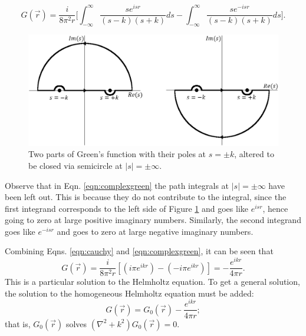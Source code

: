 %
\begin{equation}
\label{eqn:complexgreen}
G(\vec{r})=\frac{i}{8\pi^2r}\Big[ \int_{-\infty}^\infty \frac{se^{isr}}{(s-k)(s+k)}ds-\int_{-\infty}^\infty \frac{se^{-isr}}{(s-k)(s+k)}ds \Big].
\end{equation}
%
\begin{figure}
  \centering
    \includegraphics[width=\textwidth]{Figures/complexgreen} 
  \caption{Two parts of Green's function with their poles at $s=\pm k$, altered to be closed via semicircle at $|s|=\pm\infty$.}
  \label{fig:complexgreen}
\end{figure}

Observe that in Eqn. \ref{eqn:complexgreen} the path integrals at $|s|=\pm\infty$ have been left out. This is because they do not contribute to the integral, since the first integrand corresponds to the left side of Figure \ref{fig:complexgreen} and goes like $e^{isr}$, hence going to zero at large positive imaginary numbers. Similarly, the second integrand goes like $e^{-isr}$ and goes to zero at large negative imaginary numbers.

Combining Eqns. \ref{eqn:cauchy} and \ref{eqn:complexgreen}, it can be seen that
%
\begin{equation}
\nonumber
G(\vec{r})=\frac{i}{8\pi^2r}[(i\pi e^{ikr})-(-i\pi e^{ikr})]=-\frac{e^{ikr}}{4\pi r}.
\end{equation}
This is a particular solution to the Helmholtz equation. To get a general solution, the solution to the homogeneous Helmholtz equation must be added:
%
\begin{equation}
\label{eqn:greensolution}
G(\vec{r})=G_0(\vec{r})-\frac{e^{ikr}}{4\pi r};
\end{equation}
that is, $G_0(\vec{r})$ solves $(\nabla^2+k^2)G_0(\vec{r})=0$.


